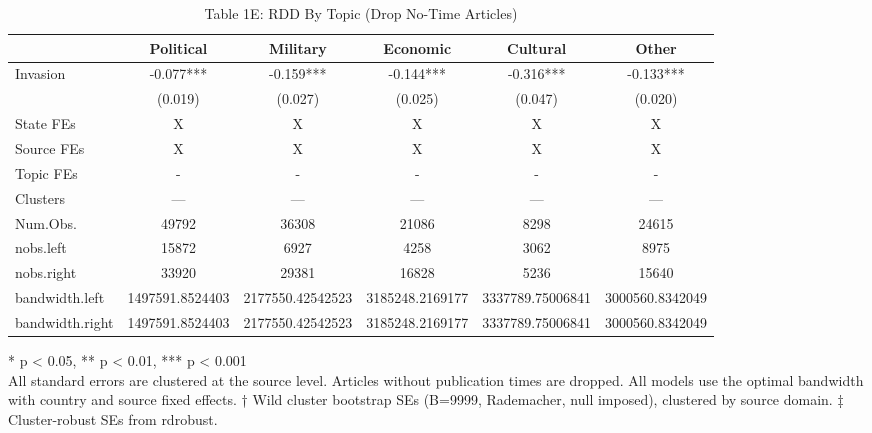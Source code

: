 \begin{table}[!t]
\caption{Table 1E: RDD By Topic (Drop No-Time Articles)} 
\fontsize{12.0pt}{14.4pt}\selectfont
\begin{tabular*}{\linewidth}{@{\extracolsep{\fill}}lccccc}
\toprule
  & Political & Military & Economic & Cultural & Other \\ 
\midrule\addlinespace[2.5pt]
Invasion & -0.077*** & -0.159*** & -0.144*** & -0.316*** & -0.133*** \\ 
{} & {(0.019)} & {(0.027)} & {(0.025)} & {(0.047)} & {(0.020)} \\ 
State FEs & X & X & X & X & X \\ 
Source FEs & X & X & X & X & X \\ 
Topic FEs & - & - & - & - & - \\ 
Clusters & — & — & — & — & — \\ 
Num.Obs. & 49792 & 36308 & 21086 & 8298 & 24615 \\ 
nobs.left & 15872 & 6927 & 4258 & 3062 & 8975 \\ 
nobs.right & 33920 & 29381 & 16828 & 5236 & 15640 \\ 
bandwidth.left & 1497591.8524403 & 2177550.42542523 & 3185248.2169177 & 3337789.75006841 & 3000560.8342049 \\ 
bandwidth.right & 1497591.8524403 & 2177550.42542523 & 3185248.2169177 & 3337789.75006841 & 3000560.8342049 \\ 
\bottomrule
\end{tabular*}
\begin{minipage}{\linewidth}
* p < 0.05, ** p < 0.01, *** p < 0.001\\
All standard errors are clustered at the source level. Articles without
publication times are dropped. All models use the optimal bandwidth with country
and source fixed effects. † Wild cluster bootstrap SEs (B=9999, Rademacher, null
imposed), clustered by source domain. ‡ Cluster-robust SEs from rdrobust.\\
\end{minipage}
\end{table}

